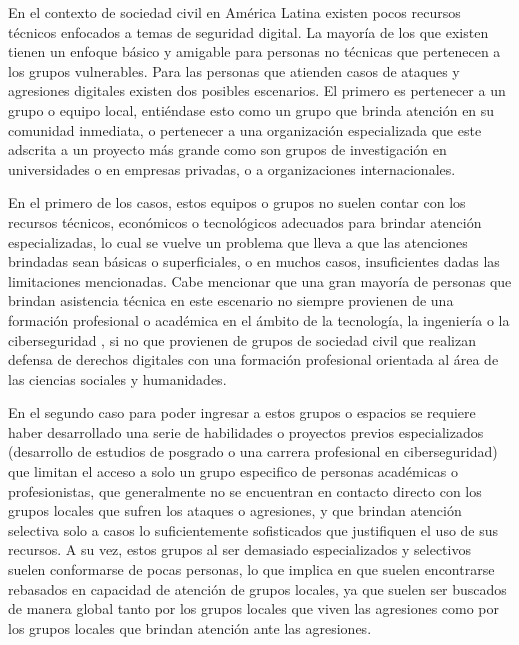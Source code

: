 \documentclass[12pt]{caltech_thesis}
\begin{document}
En el contexto de sociedad civil en América Latina  existen pocos recursos técnicos enfocados a temas de seguridad digital. La mayoría de los que existen tienen un enfoque básico y amigable para personas no técnicas que pertenecen a los grupos vulnerables. Para las personas que atienden casos de ataques y agresiones digitales existen dos posibles escenarios. El primero es pertenecer a un grupo o equipo local, entiéndase esto como un grupo que brinda atención en su comunidad inmediata, o pertenecer a una organización especializada que este adscrita a un proyecto más grande como son grupos de investigación en universidades o en empresas privadas, o a organizaciones internacionales.

En el primero de los casos, estos equipos o grupos no suelen contar con los recursos técnicos, económicos o tecnológicos adecuados para brindar atención especializadas, lo cual se vuelve un problema que lleva a que las atenciones brindadas sean básicas o superficiales, o en muchos casos, insuficientes dadas las limitaciones mencionadas. Cabe mencionar que una gran mayoría de personas que brindan asistencia técnica en este escenario no siempre provienen de una formación profesional o académica en el ámbito de la tecnología, la ingeniería o la ciberseguridad , si no que provienen de grupos de sociedad civil que realizan defensa de derechos digitales  con una formación profesional orientada al área de las ciencias sociales y humanidades.

En el segundo caso para poder ingresar a estos grupos o espacios se requiere haber desarrollado una serie de habilidades o proyectos previos especializados (desarrollo de estudios de posgrado o una carrera profesional en ciberseguridad) que limitan el acceso a solo un grupo especifico de personas académicas o profesionistas, que generalmente no se encuentran en contacto directo con los grupos locales que sufren los ataques o agresiones, y que brindan atención selectiva solo a casos lo suficientemente sofisticados que justifiquen el uso de sus recursos. A su vez, estos grupos al ser demasiado especializados y selectivos suelen conformarse de pocas personas, lo que implica en que suelen encontrarse rebasados en capacidad de atención de grupos locales, ya que suelen ser buscados de manera global tanto por los grupos locales que viven las agresiones como por los grupos locales que brindan atención ante las agresiones.
\end{document}
